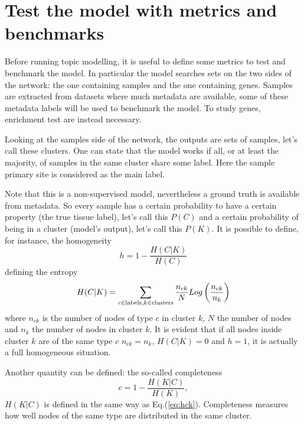 \section{Test the model with metrics and benchmarks}
Before running topic modelling, it is useful to define some metrics to test and benchmark the model. In particular the model searches sets on the two sides of the network: the one containing samples and the one containing genes. Samples are extracted from datasets where much metadata are available, some of these metadata labels will be used to benchmark the model. To study genes, enrichment test are instead necessary.

Looking at the samples side of the network, the outputs are sets of samples, let's call these clusters. One can state that the model works if all, or at least the majority, of samples in the same cluster share some label. Here the sample primary site is considered as the main label.

Note that this is a non-supervised model, nevertheless a ground truth is available from metadata. So every sample has a certain probability to have a certain property (the true tissue label), let's call this $P(C)$ and a certain probability of being in a cluster (model's output), let's call this $P(K)$.
It is possible to define, for instance, the homogeneity
\begin{equation}\label{eq:homogeneity}
    h=1-\frac{H(C|K)}{H(C)}
\end{equation}
defining the entropy
\begin{equation}\label{eq:hck}
    H(C|K)=\sum_{c\in \mathrm{labels},\\ k \in \mathrm{clusters}}\frac{n_{c k}}{N}Log\left(\frac{n_{c k}}{n_k}\right)
\end{equation}
where $n_{c k}$ is the number of nodes of type $c$ in cluster $k$, $N$ the number of nodes and $n_k$ the number of nodes in cluster $k$. It is evident that if all nodes inside cluster $k$ are of the same type $c$ $n_{c k}=n_{k}$, $H(C|K)=0$ and $h=1$, it is actually a full homogeneous situation.

Another quantity can be defined: the so-called completeness
\begin{equation}\label{eq:completness}
    c=1-\frac{H(K|C)}{H(K)},
\end{equation}
$H(K|C)$ is defined in the same way as Eq.(\ref{eq:hck}). Completeness measures how well nodes of the same type are distributed in the same cluster.

